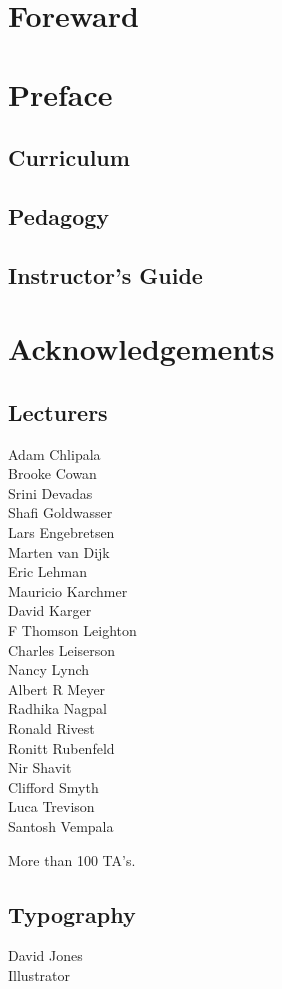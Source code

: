 \chapter*{Foreward}

\chapter*{Preface}


\section*{Curriculum}

\section*{Pedagogy}

\section*{Instructor's Guide}


\chapter*{Acknowledgements}

\section*{Lecturers}

Adam Chlipala\\
Brooke Cowan\\
Srini Devadas\\
Shafi Goldwasser\\
Lars Engebretsen\\
Marten van Dijk\\
Eric Lehman\\
Mauricio Karchmer\\
David Karger\\
F Thomson Leighton\\
Charles Leiserson\\
Nancy Lynch\\
Albert R Meyer\\
Radhika Nagpal\\
Ronald Rivest\\
Ronitt Rubenfeld\\
Nir Shavit\\
Clifford Smyth\\
Luca Trevison\\
Santosh Vempala

More than 100 TA's.

\section*{Typography}

David Jones\\
Illustrator

\endinput
